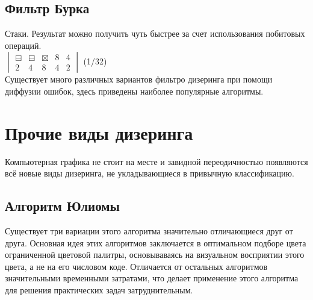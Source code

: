 \subsection{Фильтр Бурка}
Стаки. Результат можно получить чуть быстрее за счет использования побитовых операций.\\
$\begin{vmatrix}
\boxminus &  \boxminus & \boxtimes  & 8 & 4\\
2 & 4 & 8 & 4 & 2
\end{vmatrix}$ (1/32)\\
Существует много различных вариантов фильтро дизеринга при помощи диффузии ошибок, здесь приведены наиболее  популярные алгоритмы.\cite{Dh}
\section{Прочие виды дизеринга}
Компьютерная графика не стоит на месте и завидной переодичностью появляются всё новые виды дизеринга, не укладывающиеся в привычную классификацию.
\subsection{Алгоритм Юлиомы}
Существует три вариации этого алгоритма \cite{Wiki_Yliluoma} значительно отличающиеся друг от друга. Основная идея этих алгоритмов заключается в оптимальном подборе цвета ограниченной цветовой палитры, основываваясь на визуальном восприятии этого цвета, а не на его числовом коде. Отличается от остальных алгоритмов значительными временными затратами, что делает применение этого алгоритма для решения практических задач затруднительным.


